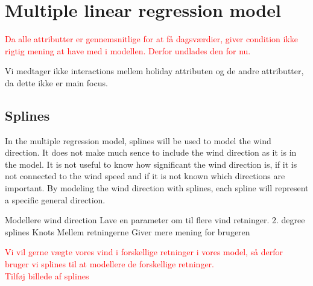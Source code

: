 \section{Multiple linear regression model}

\textcolor{red}{Da alle attributter er gennemsnitlige for at få dagsværdier, giver condition ikke rigtig mening at have med i modellen. Derfor undlades den for nu.}

Vi medtager ikke interactions mellem holiday attributen og de andre attributter, da dette ikke er main focus. 

\subsection{Splines}
In the multiple regression model, splines will be used to model the wind direction. It does not make much sence to include the wind direction as it is in the model. It is not useful to know how significant the wind direction is, if it is not connected to the wind speed and if it is not known which directions are important. By modeling the wind direction with splines, each spline will represent a specific general direction.

Modellere wind direction
Lave en parameter om til flere vind retninger.
2. degree splines
Knots
Mellem retningerne
Giver mere mening for brugeren

\textcolor{red}{Vi vil gerne vægte vores vind i forskellige retninger i vores model, så derfor bruger vi splines til at modellere de forskellige retninger.} \\

\textcolor{red}{Tilføj billede af splines}



